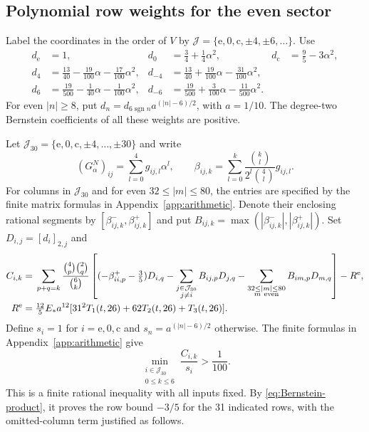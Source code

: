 \documentclass[a4paper,11pt]{article}
\numberwithin{equation}{section}
\theoremstyle{definition}
\theoremstyle{remark}
\begin{document}
\subsection{Polynomial row weights for the even sector}
Label the coordinates in the order of $V$ by $\mathcal J=\{\mathrm e,0,\mathrm c,\pm4,\pm6,\ldots\}$. Use
\begin{equation}\label{eq:even-weights}
\begin{aligned}
 d_{\mathrm e}&=1,&d_0&=\tfrac34+\tfrac14\alpha^2,&d_{\mathrm c}&=\tfrac95-3\alpha^2,\\
 d_4&=\tfrac{13}{40}-\tfrac{19}{100}\alpha-\tfrac{17}{100}\alpha^2,
 &d_{-4}&=\tfrac{13}{40}+\tfrac{19}{100}\alpha-\tfrac{31}{100}\alpha^2,\\
 d_6&=\tfrac{19}{500}-\tfrac1{40}\alpha-\tfrac1{100}\alpha^2,
 &d_{-6}&=\tfrac{19}{500}+\tfrac3{100}\alpha-\tfrac{11}{500}\alpha^2.
\end{aligned}
\end{equation}
For even $|n|\ge8$, put $d_n=d_{6\operatorname{sgn}n}a^{(|n|-6)/2}$, with $a=1/10$. The degree-two Bernstein coefficients of all these weights are positive.

Let $\mathcal J_{30}=\{\mathrm e,0,\mathrm c,\pm4,\ldots,\pm30\}$ and write
\[
 (G_\alpha^N)_{ij}=\sum_{l=0}^4g_{ij,l}\alpha^l,
 \qquad \beta_{ij,k}=\sum_{l=0}^k\frac{\binom kl}{2^l\binom4l}g_{ij,l}.
\]
For columns in $\mathcal J_{30}$ and for even $32\le|m|\le80$, the entries are specified by the finite matrix formulas in Appendix~\ref{app:arithmetic}. Denote their enclosing rational segments by $[\beta^-_{ij,k},\beta^+_{ij,k}]$ and put $B_{ij,k}=\max(|\beta^-_{ij,k}|,|\beta^+_{ij,k}|)$. Set $D_{i,j}=[d_i]_{2,j}$ and
\begin{equation}\label{eq:even-row-Bernstein}
\begin{aligned}
 C_{i,k}={}&\sum_{p+q=k}\frac{\binom4p\binom2q}{\binom6k}
 \left[(-\beta^+_{ii,p}-\tfrac35)D_{i,q}
 -\sum_{\substack{j\in\mathcal J_{30}\\j\ne i}}B_{ij,p}D_{j,q}
 -\sum_{\substack{32\le|m|\le80\\m\ \mathrm{even}}}B_{im,p}D_{m,q}\right]
 -R^{\rm e},\\
 R^{\rm e}={}&\tfrac{12}{5}E_*a^{12}
 [31^2T_1(t,26)+62T_2(t,26)+T_3(t,26)].
\end{aligned}
\end{equation}
Define $s_i=1$ for $i=\mathrm e,0,\mathrm c$ and $s_n=a^{(|n|-6)/2}$ otherwise. The finite formulas in Appendix~\ref{app:arithmetic} give
\begin{equation}\label{eq:even-uniform}
 \min_{\substack{i\in\mathcal J_{30}\\0\le k\le6}}\frac{C_{i,k}}{s_i}>\frac1{100}.
\end{equation}
This is a finite rational inequality with all inputs fixed. By \eqref{eq:Bernstein-product}, it proves the row bound $-3/5$ for the 31 indicated rows, with the omitted-column term justified as follows.
\end{document}
